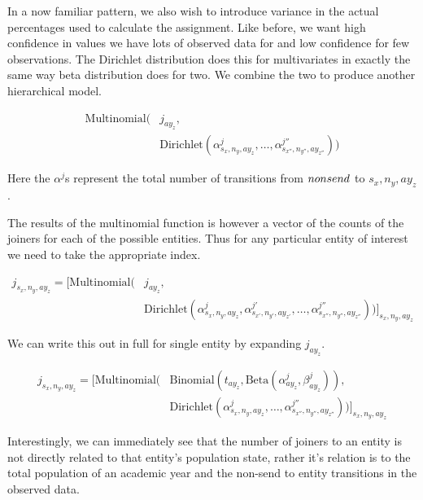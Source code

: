 \documentclass[margin=5mm]{article}
\begin{document}
In a now familiar pattern, we also wish to introduce variance in the
actual percentages used to calculate the assignment.  Like before, we
want high confidence in values we have lots of observed data for and
low confidence for few observations.  The Dirichlet distribution does
this for multivariates in exactly the same way beta distribution does
for two.  We combine the two to produce another hierarchical model.

\begin{equation*}
\begin{split}
  \text{Multinomial} ( & j_{ay_{z}}, \\
  & \text{Dirichlet} (\alpha^{j}_{s_x,n_y,ay_z}, \dots,
  \alpha^{j''}_{s_{x''},n_{y''},ay_{z''}}))
\end{split}
\end{equation*}

Here the $\alpha^{j}$s represent the total number of transitions from
$non\-send$ to ${s_x,n_y,ay_z}$.

The results of the multinomial function is however a vector of the
counts of the joiners for each of the possible entities.  Thus for any
particular entity of interest we need to take the appropriate index.

\begin{equation*}
  \begin{split}
    j_{s_x,n_y,ay_z} = \bigg[\text{Multinomial}( & j_{ay_z}, \\
    & \text{Dirichlet}(\alpha^{j}_{s_x,n_y,ay_z},\alpha^{j'}_{s_{x'},n_{y'},ay_{z'}}, \dots, \alpha^{j''}_{s_{x''},n_{y''},ay_{z''}}))\bigg]_{s_x,n_y,ay_z}
  \end{split}
\end{equation*}

We can write this out in full for single entity by expanding
$j_{ay_z}$.

\begin{equation*}
  \begin{split}
j_{s_x,n_y,ay_z} = \bigg[\text{Multinomial}( & \text{Binomial}( t_{ay_z},
\text{Beta}(\alpha^j_{ay_z},\beta^j_{ay_z})), \\
& \text{Dirichlet}(\alpha^{j}_{s_x,n_y,ay_z}, \dots
, \alpha^{j''}_{s_{x''},n_{y''},ay_{z''}}))\bigg]_{s_x,n_y,ay_z}
  \end{split}
\end{equation*}

Interestingly, we can immediately see that the number of joiners to an
entity is not directly related to that entity's population state,
rather it's relation is to the total population of an academic year
and the non-send to entity transitions in the observed data.
\end{document}

